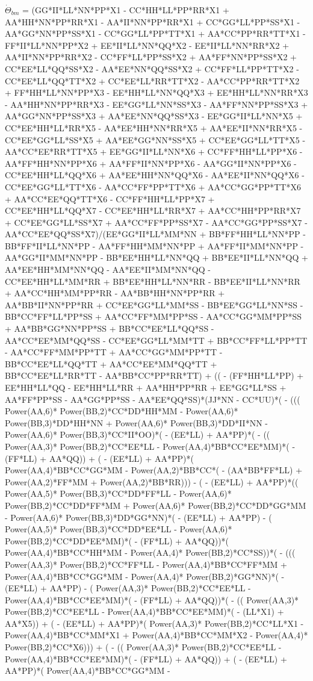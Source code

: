 \documentclass[10pt]{article} %
\begin{document}
$\dot{\Theta}_{bm}$ =
{\tiny
  (GG*II*LL*NN*PP*X1 - CC*HH*LL*PP*RR*X1 + AA*HH*NN*PP*RR*X1 - AA*II*NN*PP*RR*X1 + CC*GG*LL*PP*SS*X1 - AA*GG*NN*PP*SS*X1 - CC*GG*LL*PP*TT*X1 + AA*CC*PP*RR*TT*X1 - FF*II*LL*NN*PP*X2 + EE*II*LL*NN*QQ*X2 - EE*II*LL*NN*RR*X2 + AA*II*NN*PP*RR*X2 - CC*FF*LL*PP*SS*X2 + AA*FF*NN*PP*SS*X2 + CC*EE*LL*QQ*SS*X2 - AA*EE*NN*QQ*SS*X2 + CC*FF*LL*PP*TT*X2 - CC*EE*LL*QQ*TT*X2 + CC*EE*LL*RR*TT*X2 - AA*CC*PP*RR*TT*X2 + FF*HH*LL*NN*PP*X3 - EE*HH*LL*NN*QQ*X3 + EE*HH*LL*NN*RR*X3 - AA*HH*NN*PP*RR*X3 - EE*GG*LL*NN*SS*X3 - AA*FF*NN*PP*SS*X3 + AA*GG*NN*PP*SS*X3 + AA*EE*NN*QQ*SS*X3 - EE*GG*II*LL*NN*X5 + CC*EE*HH*LL*RR*X5 - AA*EE*HH*NN*RR*X5 + AA*EE*II*NN*RR*X5 - CC*EE*GG*LL*SS*X5 + AA*EE*GG*NN*SS*X5 + CC*EE*GG*LL*TT*X5 - AA*CC*EE*RR*TT*X5 + EE*GG*II*LL*NN*X6 + CC*FF*HH*LL*PP*X6 - AA*FF*HH*NN*PP*X6 + AA*FF*II*NN*PP*X6 - AA*GG*II*NN*PP*X6 - CC*EE*HH*LL*QQ*X6 + AA*EE*HH*NN*QQ*X6 - AA*EE*II*NN*QQ*X6 - CC*EE*GG*LL*TT*X6 - AA*CC*FF*PP*TT*X6 + AA*CC*GG*PP*TT*X6 + AA*CC*EE*QQ*TT*X6 - CC*FF*HH*LL*PP*X7 + CC*EE*HH*LL*QQ*X7 - CC*EE*HH*LL*RR*X7 + AA*CC*HH*PP*RR*X7 + CC*EE*GG*LL*SS*X7 + AA*CC*FF*PP*SS*X7 - AA*CC*GG*PP*SS*X7 - AA*CC*EE*QQ*SS*X7)/(EE*GG*II*LL*MM*NN + BB*FF*HH*LL*NN*PP - BB*FF*II*LL*NN*PP - AA*FF*HH*MM*NN*PP + AA*FF*II*MM*NN*PP - AA*GG*II*MM*NN*PP - BB*EE*HH*LL*NN*QQ + BB*EE*II*LL*NN*QQ + AA*EE*HH*MM*NN*QQ - AA*EE*II*MM*NN*QQ - CC*EE*HH*LL*MM*RR + BB*EE*HH*LL*NN*RR - BB*EE*II*LL*NN*RR + AA*CC*HH*MM*PP*RR - AA*BB*HH*NN*PP*RR + AA*BB*II*NN*PP*RR + CC*EE*GG*LL*MM*SS - BB*EE*GG*LL*NN*SS - BB*CC*FF*LL*PP*SS + AA*CC*FF*MM*PP*SS - AA*CC*GG*MM*PP*SS + AA*BB*GG*NN*PP*SS + BB*CC*EE*LL*QQ*SS - AA*CC*EE*MM*QQ*SS - CC*EE*GG*LL*MM*TT + BB*CC*FF*LL*PP*TT - AA*CC*FF*MM*PP*TT + AA*CC*GG*MM*PP*TT - BB*CC*EE*LL*QQ*TT + AA*CC*EE*MM*QQ*TT + BB*CC*EE*LL*RR*TT - AA*BB*CC*PP*RR*TT) + (( - (FF*HH*LL*PP) + EE*HH*LL*QQ - EE*HH*LL*RR + AA*HH*PP*RR + EE*GG*LL*SS + AA*FF*PP*SS - AA*GG*PP*SS - AA*EE*QQ*SS)*(JJ*NN - CC*UU)*( - ((( Power(AA,6)* Power(BB,2)*CC*DD*HH*MM -  Power(AA,6)* Power(BB,3)*DD*HH*NN +  Power(AA,6)* Power(BB,3)*DD*II*NN -  Power(AA,6)* Power(BB,3)*CC*II*OO)*( - (EE*LL) + AA*PP)*( - (( Power(AA,3)* Power(BB,2)*CC*EE*LL -  Power(AA,4)*BB*CC*EE*MM)*( - (FF*LL) + AA*QQ)) + ( - (EE*LL) + AA*PP)*( Power(AA,4)*BB*CC*GG*MM -  Power(AA,2)*BB*CC*( - (AA*BB*FF*LL) +  Power(AA,2)*FF*MM +  Power(AA,2)*BB*RR))) - ( - (EE*LL) + AA*PP)*(( Power(AA,5)* Power(BB,3)*CC*DD*FF*LL -  Power(AA,6)* Power(BB,2)*CC*DD*FF*MM +  Power(AA,6)* Power(BB,2)*CC*DD*GG*MM -  Power(AA,6)* Power(BB,3)*DD*GG*NN)*( - (EE*LL) + AA*PP) - ( Power(AA,5)* Power(BB,3)*CC*DD*EE*LL -  Power(AA,6)* Power(BB,2)*CC*DD*EE*MM)*( - (FF*LL) + AA*QQ))*( Power(AA,4)*BB*CC*HH*MM -  Power(AA,4)* Power(BB,2)*CC*SS))*( - ((( Power(AA,3)* Power(BB,2)*CC*FF*LL -  Power(AA,4)*BB*CC*FF*MM +  Power(AA,4)*BB*CC*GG*MM -  Power(AA,4)* Power(BB,2)*GG*NN)*( - (EE*LL) + AA*PP) - ( Power(AA,3)* Power(BB,2)*CC*EE*LL -  Power(AA,4)*BB*CC*EE*MM)*( - (FF*LL) + AA*QQ))*( - (( Power(AA,3)* Power(BB,2)*CC*EE*LL -  Power(AA,4)*BB*CC*EE*MM)*( - (LL*X1) + AA*X5)) + ( - (EE*LL) + AA*PP)*( Power(AA,3)* Power(BB,2)*CC*LL*X1 -  Power(AA,4)*BB*CC*MM*X1 +  Power(AA,4)*BB*CC*MM*X2 -  Power(AA,4)* Power(BB,2)*CC*X6))) + ( - (( Power(AA,3)* Power(BB,2)*CC*EE*LL -  Power(AA,4)*BB*CC*EE*MM)*( - (FF*LL) + AA*QQ)) + ( - (EE*LL) + AA*PP)*( Power(AA,4)*BB*CC*GG*MM -  }
\end{document}
